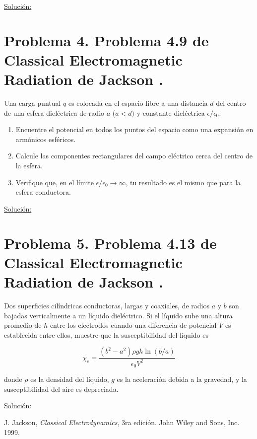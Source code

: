 \documentclass[a4paper,11pt]{article}
\numberwithin{equation}{section}
\begin{document}
\vspace{.3cm}

\underline{Solución:} \vspace{.3cm}

\newpage

\section{Problema 4. Problema 4.9 de Classical Electromagnetic Radiation
de Jackson \cite{jackson}.}

Una carga puntual $q$ es colocada en el espacio libre a una distancia $d$ del centro 
de una esfera dieléctrica de radio $a$ ($a < d)$ y constante dieléctrica 
$\epsilon/\epsilon_0$. 

\begin{enumerate}[label=\textbf{(\alph*)}]
\item Encuentre el potencial en todos los puntos del espacio como una expansión 
en armónicos esféricos.
\item Calcule las componentes rectangulares del campo eléctrico cerca del 
centro de la esfera.
\item Verifique que, en el límite $\epsilon/\epsilon_0 \rightarrow \infty$, tu 
resultado es el mismo que para la esfera conductora.
\end{enumerate}

\vspace{.3cm}

\underline{Solución:} \vspace{.3cm}

\newpage

\section{Problema 5. Problema 4.13 de Classical Electromagnetic Radiation
de Jackson \cite{jackson}.}

Dos superficies cilíndricas conductoras, largas y coaxiales, de radios $a$ y $b$ 
son bajadas verticalmente a un líquido dieléctrico. Si el líquido sube una altura 
promedio de $h$ entre los electrodos cuando una diferencia de potencial $V$ es 
establecida entre ellos, muestre que la susceptibilidad del líquido es 

$$
\chi_e = \frac{(b^2 - a^2)\rho g h \ln{(b/a)}}{\epsilon_0 V^2}
$$

donde $\rho$ es la densidad del líquido, $g$ es la aceleración debida a la gravedad, 
y la susceptibilidad del aire es depreciada.

\vspace{.3cm}

\underline{Solución:} \vspace{.3cm}

\newpage

\begin{thebibliography}{10}
J. Jackson, \emph{Classical Electrodynamics}, 3ra edición. John Wiley and Sons, Inc. 
1999.
\end{thebibliography}
\end{document}

